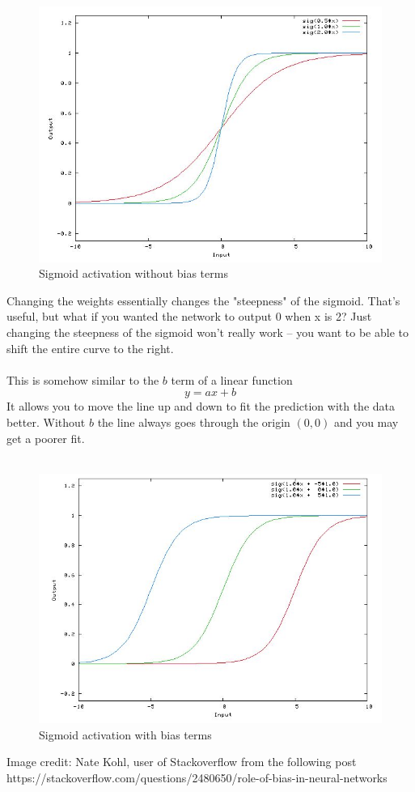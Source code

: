 \documentclass{article}
\begin{document}
\begin{figure}[h]
	\begin{center}
		\includegraphics[scale = 0.5]{activation_wo_bias.jpg}
		\caption{Sigmoid activation without bias terms}
	\end{center}
\end{figure}
Changing the weights essentially changes the "steepness" of the sigmoid. That's useful, but what if you wanted the network to output 0 when x is 2? Just changing the steepness of the sigmoid won't really work -- you want to be able to shift the entire curve to the right. \\ \\
This is somehow similar to the $b$ term of a linear function
$$y = ax + b$$
It allows you to move the line up and down to fit the prediction with the data better. Without $b$ the line always goes through the origin $(0, 0)$ and you may get a poorer fit. \\ \\
\begin{figure}[h]
	\begin{center}
		\includegraphics[scale = 0.5]{activation_w_bias.jpg}
		\caption{Sigmoid activation with bias terms}
	\end{center}
\end{figure}
Image credit: Nate Kohl, user of Stackoverflow from the following post
https://stackoverflow.com/questions/2480650/role-of-bias-in-neural-networks
\end{document}
